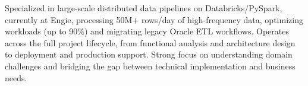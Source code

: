 \documentclass[english]{plushcv}
\begin{document}

\small{
}

\vspace{16pt}

Specialized in large-scale distributed data pipelines on Databricks/PySpark, currently at Engie, processing 50M+ rows/day of high-frequency data, optimizing workloads (up to 90\%) and migrating legacy Oracle ETL workflows. Operates across the full project lifecycle, from functional analysis and architecture design to deployment and production support. Strong focus on understanding domain challenges and bridging the gap between technical implementation and business needs.

\vspace{-6pt}
\end{document}
